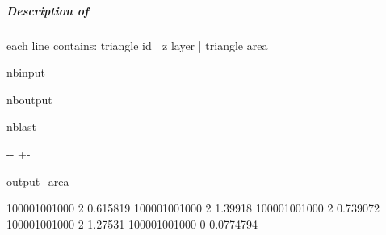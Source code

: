 \documentclass[letterpaper,10pt,english]{sphinxmanual}
\begin{document}
\subparagraph{Description of }
\label{\detokenize{misc_functionnalities:Description-of-s2v.area}}
\sphinxAtStartPar
each line contains: triangle id | z layer | triangle area

\begin{sphinxuseclass}{nbinput}
{
\begin{sphinxVerbatim}[commandchars=\\\{\}]
\llap{\color{nbsphinxin}[14]:\,\hspace{\fboxrule}\hspace{\fboxsep}}    
    
       
         
\end{sphinxVerbatim}
}

\end{sphinxuseclass}
\begin{sphinxuseclass}{nboutput}
\begin{sphinxuseclass}{nblast}
{

\kern-\sphinxverbatimsmallskipamount\kern-\baselineskip
\kern+\FrameHeightAdjust\kern-\fboxrule
\vspace{\nbsphinxcodecellspacing}

\begin{sphinxuseclass}{output_area}
\begin{sphinxuseclass}{}


\begin{sphinxVerbatim}[commandchars=\\\{\}]
100001001000     2       0.615819
100001001000     2       1.39918
100001001000     2       0.739072
100001001000     2       1.27531
100001001000     0       0.0774794
\end{sphinxVerbatim}



\end{sphinxuseclass}
\end{sphinxuseclass}
}

\end{sphinxuseclass}
\end{sphinxuseclass}
\end{document}
